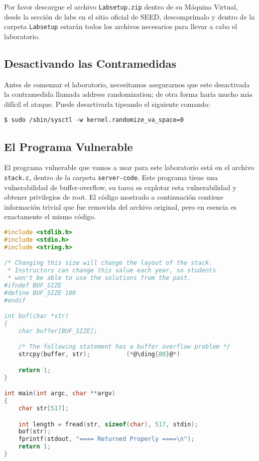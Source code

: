 Por favor descargue el archivo \texttt{Labsetup.zip} dentro de su Máquina Virtual, desde la sección de labs en el sitio oficial de SEED, descomprímalo y dentro de la carpeta \texttt{Labsetup} estarán todos los archivos necesarios para llevar a cabo el laboratorio.


\subsection{Desactivando las Contramedidas} 

Antes de comenzar el laboratorio, necesitamos asegurarnos que este desactivada la contramedida llamada address randomization; de otra forma haría mucho más difícil el ataque.
Puede desactivarla tipeando el siguiente comando:

\begin{lstlisting}
$ sudo /sbin/sysctl -w kernel.randomize_va_space=0
\end{lstlisting}
 

\subsection{El Programa Vulnerable} 
\label{sec:vulnerable_program}

El programa vulnerable que vamos a usar para este laboratorio está en el archivo \texttt{stack.c}, dentro de la carpeta \texttt{server-code}.
Este programa tiene una vulnerabilidad de buffer-overflow, su tarea es explotar esta vulnerabilidad y obtener privilegios de root.
El código mostrado a continuación contiene información trivial que fue removida del archivo original, pero en esencia es exactamente el mismo código.

\begin{lstlisting}[language=C, caption={\texttt{stack.c}}]
#include <stdlib.h>
#include <stdio.h>
#include <string.h>

/* Changing this size will change the layout of the stack.
 * Instructors can change this value each year, so students
 * won't be able to use the solutions from the past.
#ifndef BUF_SIZE
#define BUF_SIZE 100
#endif

int bof(char *str)
{
    char buffer[BUF_SIZE];

    /* The following statement has a buffer overflow problem */ 
    strcpy(buffer, str);          (*@\ding{80}@*)

    return 1;
}

int main(int argc, char **argv)
{
    char str[517];

    int length = fread(str, sizeof(char), 517, stdin);
    bof(str);
    fprintf(stdout, "==== Returned Properly ====\n");
    return 1;
}
\end{lstlisting}

